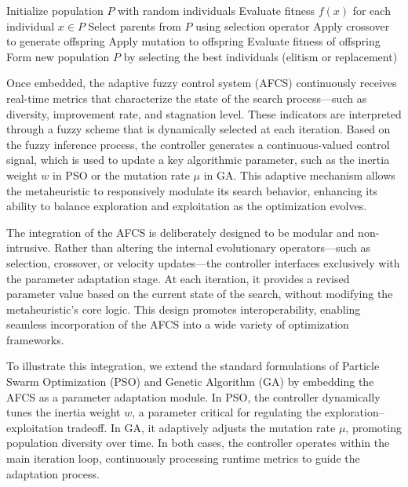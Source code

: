 \begin{algorithm}[H]
\caption{Standard Genetic Algorithm (GA)} \label{alg:GA_normal}
\begin{algorithmic}[1]
\State Initialize population $P$ with random individuals
\State Evaluate fitness $f(x)$ for each individual $x \in P$
    \State Select parents from $P$ using selection operator
    \State Apply crossover to generate offspring
    \State Apply mutation to offspring
    \State Evaluate fitness of offspring
    \State Form new population $P$ by selecting the best individuals (elitism or replacement)
\EndWhile
\end{algorithmic}
\end{algorithm}

Once embedded, the adaptive fuzzy control system (AFCS) continuously receives real-time metrics that characterize the state of the search process—such as diversity, improvement rate, and stagnation level. These indicators are interpreted through a fuzzy scheme that is dynamically selected at each iteration. Based on the fuzzy inference process, the controller generates a continuous-valued control signal, which is used to update a key algorithmic parameter, such as the inertia weight $w$ in PSO or the mutation rate $\mu$ in GA. This adaptive mechanism allows the metaheuristic to responsively modulate its search behavior, enhancing its ability to balance exploration and exploitation as the optimization evolves.

The integration of the AFCS is deliberately designed to be modular and non-intrusive. Rather than altering the internal evolutionary operators—such as selection, crossover, or velocity updates—the controller interfaces exclusively with the parameter adaptation stage. At each iteration, it provides a revised parameter value based on the current state of the search, without modifying the metaheuristic's core logic. This design promotes interoperability, enabling seamless incorporation of the AFCS into a wide variety of optimization frameworks.

To illustrate this integration, we extend the standard formulations of Particle Swarm Optimization (PSO) and Genetic Algorithm (GA) by embedding the AFCS as a parameter adaptation module. In PSO, the controller dynamically tunes the inertia weight $w$, a parameter critical for regulating the exploration–exploitation tradeoff. In GA, it adaptively adjusts the mutation rate $\mu$, promoting population diversity over time. In both cases, the controller operates within the main iteration loop, continuously processing runtime metrics to guide the adaptation process.

